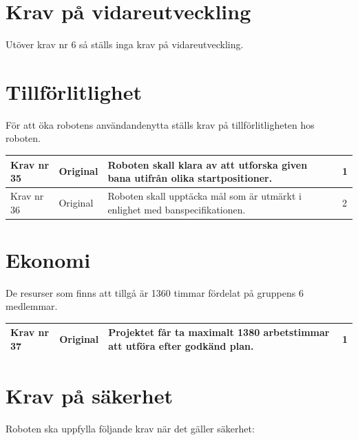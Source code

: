 \documentclass[11pt]{article}
\begin{document}
\begin{flushleft}
\section{Krav på vidareutveckling}
Utöver krav nr 6 så ställs inga krav på vidareutveckling.

\section{Tillförlitlighet}
För att öka robotens användandenytta ställs krav på tillförlitligheten hos roboten.

\begin{center}
\begin{longtable}{|l|l|p{.70\linewidth}|l|} \hline

Krav nr 35 &
Original &
Roboten skall klara av att utforska given bana utifrån olika startpositioner. &
1 \\ \hline

Krav nr 36 &
Original &
Roboten skall upptäcka mål som är utmärkt i enlighet med banspecifikationen. &
2 \\ \hline

\end{longtable}
\end{center}

\section{Ekonomi}
De resurser som finns att tillgå är 1360 timmar fördelat på gruppens 6 medlemmar. 

\begin{center}
\begin{longtable}{|l|l|p{.70\linewidth}|l|} \hline

Krav nr 37 &
Original &
Projektet får ta maximalt 1380 arbetstimmar att utföra efter godkänd plan. &
1 \\ \hline
\end{longtable}
\end{center}

\section{Krav på säkerhet}
Roboten ska uppfylla följande krav när det gäller säkerhet:

\begin{center}
\begin{longtable}{|l|l|p{.70\linewidth}|l|} \hline


\end{longtable}
\end{center}
\end{flushleft}
\end{document}
